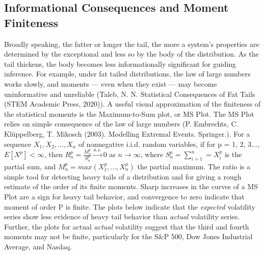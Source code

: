\documentclass[11pt,a4paper,oldfontcommands]{memoir}
\begin{document}
{%

\subsection{Informational Consequences and Moment Finiteness}

Broadly speaking, the fatter or longer the tail, the more a system’s properties are determined by the exceptional and less so by the body of the distribution. As the tail thickens, the body becomes less informationally significant for guiding inference. For example, under fat tailed distributions, the law of large numbers works slowly, and moments — even when they exist — may become uninformative and unreliable (Taleb, N. N. Statistical Consequences of Fat Tails (STEM Academic Press, 2020)). A useful visual approximation of the finiteness of the statistical moments is the Maximum-to-Sum plot, or MS Plot. The MS Plot relies on simple consequence of the law of large numbers (P. Embrechts, C. Klüppelberg, T. Mikosch (2003). Modelling Extremal Events. Springer.). For a sequence $X_1, X_2, \dots, X_n$ of nonnegative i.i.d. random variables, if for p = 1, 2, 3..., $E[X^p] < \infty$, then $R_n^p = \frac{M_n^p}{S_n^p}  \overset{a.s.}{\to} 0$ as $n \to \infty$, where $S_n^p = \sum_{i=1}^{n} =  X_i^p$ is the partial sum, and $M_n^p = max(X_1^p,..., X_n^p)$ the partial maximum. The ratio is a simple tool for detecting heavy tails of a distribution and for giving a rough estimate of the order of its finite moments. Sharp increases in the curves of a MS Plot are a sign for heavy tail behavior, and convergence to zero indicate that moment of order P is finite. The plots below indicate that the \textit{expected} volatility series show less evidence of heavy tail behavior than \textit{actual} volatility series. Further, the plots for actual \textit{actual} volatility suggest that the third and fourth moments may not be finite, particularly for the S\&P 500, Dow Jones Industrial Average, and Nasdaq. 


}
\end{document}
